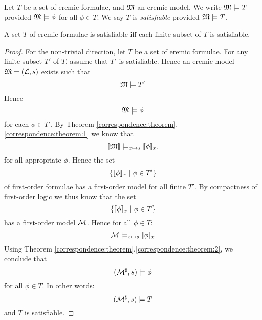 \begin{definition}
Let $T$ be a set of eremic formulae, and $\frak{M}$ an eremic model.  We
write $\frak{M} \models T$ provided $\frak{M} \models \phi$ for all $\phi \in
T$.  We say $T$ is \emph{satisfiable} provided $\frak{M} \models T$.
\end{definition}

\begin{theorem}
A set $T$ of eremic formulae is satisfiable iff each finite subset of
$T$ is satisfiable.
\end{theorem}
\begin{proof}
For the non-trivial direction, let $T$ be a set of eremic formulae.
For any finite subset $T'$ of $T$, assume that $T'$ is satisfiable.
Hence an eremic model $\frak{M} = (\mathcal{L}, s)$ exists such that
\[
   \frak{M} \models T'
\]
Hence 
\[
   \frak{M} \models \phi
\]
for each $\phi \in T'$. By Theorem \ref{correspondence:theorem}.\ref{correspondence:theorem:1} we know that
\[
   \lbrack\!\lbrack \frak{M} \rbrack\!\rbrack \models_{x \mapsto s} \lbrack\!\lbrack \phi \rbrack\!\rbrack_x.
\]
for all appropriate $\phi$. Hence the set 
\[
   \{ \lbrack\!\lbrack \phi \rbrack\!\rbrack_x\ |\ \phi \in T'\}
\]
of first-order formulae has a first-order model for all finite $T'$.
By compactness of first-order logic we thus know that the set
\[
   \{ \lbrack\!\lbrack \phi \rbrack\!\rbrack_x\ |\ \phi \in T\}
\]
has a first-order model $\mathcal{M}$. Hence for all $\phi \in T$:
\[
   \mathcal{M} \models_{x \mapsto s} \lbrack\!\lbrack \phi \rbrack\!\rbrack_x
\]
Using Theorem
\ref{correspondence:theorem}.\ref{correspondence:theorem:2}, we
conclude that
\[
   (\mathcal{M}^{\sharp}, s) \models \phi
\]
for all $\phi \in T$. In other words:
\[
   (\mathcal{M}^{\sharp}, s) \models T
\]
and $T$ is satisfiable.
\end{proof}

